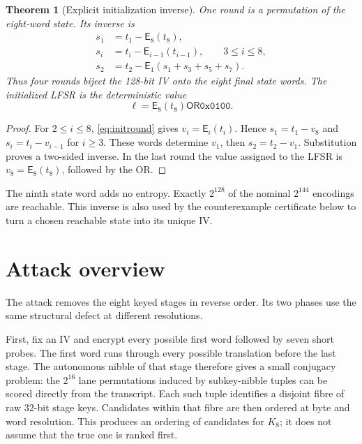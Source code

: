 \documentclass[10pt]{article}
\theoremstyle{plain}
\newtheorem{theorem}{Theorem}
\theoremstyle{definition}
\theoremstyle{remark}
\newcommand{\OR}{\mathbin{\mathsf{OR}}}
\newcommand{\E}{\mathsf E}
\newcommand{\code}[1]{\texttt{#1}}
\begin{document}
\begin{theorem}[Explicit initialization inverse]
\label{thm:init}
One round is a permutation of the eight-word state.  Its inverse is
\begin{align}
s_1&=t_1-\E_8(t_8),\nonumber\\
s_i&=t_i-\E_{i-1}(t_{i-1}),\qquad3\leq i\leq8,\nonumber\\
s_2&=t_2-\E_1(s_1+s_3+s_5+s_7).
\label{eq:initinverse}
\end{align}
Thus four rounds biject the 128-bit IV onto the eight final state words.
The initialized LFSR is the deterministic value
\begin{equation}
\ell=\E_8(t_8)\OR\code{0x0100}.
\label{eq:lfsr}
\end{equation}
\end{theorem}
\begin{proof}
For \(2\leq i\leq8\), \eqref{eq:initround} gives
\(v_i=\E_i(t_i)\).  Hence \(s_1=t_1-v_8\) and
\(s_i=t_i-v_{i-1}\) for \(i\geq3\).  These words determine \(v_1\), then
\(s_2=t_2-v_1\).  Substitution proves a two-sided inverse.  In the last round
the value assigned to the LFSR is \(v_8=\E_8(t_8)\), followed by the OR.
\end{proof}

The ninth state word adds no entropy.  Exactly \(2^{128}\) of the
nominal \(2^{144}\) encodings are reachable.  This inverse is also used by
the counterexample certificate below to turn a chosen reachable state into
its unique IV.

\section{Attack overview}
\label{sec:overview}

The attack removes the eight keyed stages in reverse order.  Its two phases
use the same structural defect at different resolutions.

First, fix an IV and encrypt every possible first word followed by seven
short probes.  The first word runs through every possible translation before
the last stage.  The autonomous nibble of that stage therefore gives a small
conjugacy problem: the \(2^{16}\) lane permutations induced by subkey-nibble
tuples can be scored directly from the transcript.  Each such tuple identifies
a disjoint fibre of raw 32-bit stage keys.  Candidates within that fibre are
then ordered at byte and word resolution.  This produces an ordering of
candidates for \(K_8\); it does not assume that the true one is ranked first.
\end{document}
